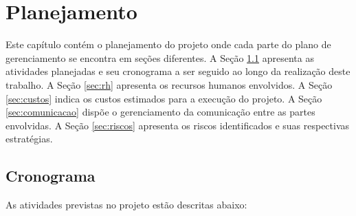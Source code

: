 \documentclass[
	12pt,				%
	openright,			%
	twoside,			%
	a4paper,			%
	english,			%
	brazil,				%
	]{abntex2}
\begin{document}

\def\coordenador{Renato Cislaghi}
\def\orientador{Vinicius Marino Calvo Torres de Freitas}
\def\coorientador{Márcio Bastos Castro}
\def\autor{Thales Alexandre Zirbel Hubner}

\chapter{Planejamento}

Este capítulo contém o planejamento do projeto onde cada parte do plano de gerenciamento se encontra em seções diferentes. A Seção \ref{sec:cronograma} apresenta as atividades planejadas e seu cronograma a ser seguido ao longo da realização deste trabalho. A Seção \ref{sec:rh} apresenta os recursos humanos envolvidos. A Seção \ref{sec:custos} indica os custos estimados para a execução do projeto. A Seção \ref{sec:comunicacao} dispõe o gerenciamento da comunicação entre as partes envolvidas. A Seção \ref{sec:riscos} apresenta os riscos identificados e suas respectivas estratégias.

\section{Cronograma}
\label{sec:cronograma}

As atividades previstas no projeto estão descritas abaixo:
\end{document}
